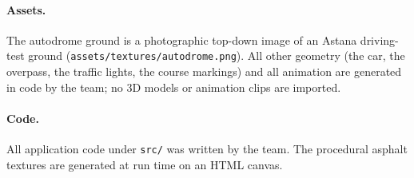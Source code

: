 \documentclass[11pt]{article}
\newcommand{\code}[1]{\texttt{#1}}
\begin{document}
\paragraph{Assets.}
The autodrome ground is a photographic top-down image of an Astana driving-test
ground (\code{assets/textures/autodrome.png}). All other geometry (the car, the
overpass, the traffic lights, the course markings) and all animation are generated
in code by the team; no 3D models or animation clips are imported.

\paragraph{Code.}
All application code under \code{src/} was written by the team. The procedural
asphalt textures are generated at run time on an HTML canvas.
\end{document}
